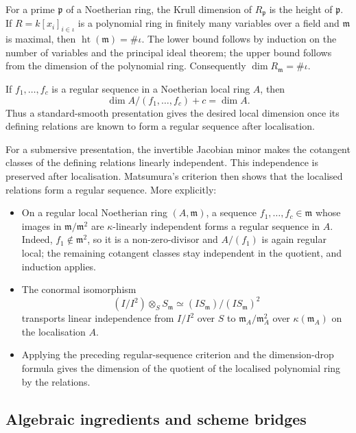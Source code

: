 For a prime \(\mathfrak p\) of a Noetherian ring, the Krull dimension
of \(R_{\mathfrak p}\) is the height of \(\mathfrak p\).  If
\(R=k[x_i]_{i\in\iota}\) is a polynomial ring in finitely many variables
over a field and \(\mathfrak m\) is maximal, then
\(\operatorname{ht}(\mathfrak m)=\#\iota\).  The lower bound follows by
induction on the number of variables and the principal ideal theorem;
the upper bound follows from the dimension of the polynomial ring.
Consequently \(\dim R_{\mathfrak m}=\#\iota\).

If \(f_1,\ldots,f_c\) is a regular sequence in a Noetherian local ring
\(A\), then
\[
  \dim A/(f_1,\ldots,f_c)+c=\dim A.
\]
Thus a standard-smooth presentation gives the desired local dimension
once its defining relations are known to form a regular sequence after
localisation.

For a submersive presentation, the invertible Jacobian minor makes the
cotangent classes of the defining relations linearly independent.  This
independence is preserved after localisation.  Matsumura's criterion then
shows that the localised relations form a regular sequence.  More explicitly:
\begin{itemize}
  \item On a regular local Noetherian ring \((A, \mathfrak m)\), a
    sequence \(f_1, \dots, f_c \in \mathfrak m\) whose images in
    \(\mathfrak m / \mathfrak m^2\) are \(\kappa\)-linearly
    independent forms a regular sequence in \(A\).  Indeed, \(f_1\notin
    \mathfrak m^2\), so it is a non-zero-divisor and \(A/(f_1)\) is again
    regular local; the remaining cotangent classes stay independent in
    the quotient, and induction applies.

  \item The conormal isomorphism
    \[
      (I/I^2) \otimes_S S_{\mathfrak m}
      \simeq (I S_{\mathfrak m})/(I S_{\mathfrak m})^2
    \]
    transports linear independence from \(I/I^2\) over \(S\) to
    \(\mathfrak m_A / \mathfrak m_A^2\) over \(\kappa(\mathfrak m_A)\)
    on the localisation \(A\).
  \item Applying the preceding regular-sequence criterion and the
    dimension-drop formula gives the dimension of the quotient of the
    localised polynomial ring by the relations.
\end{itemize}

\subsection{Algebraic ingredients and scheme bridges}
\label{subsec:codim1_substrate_lemmas}

